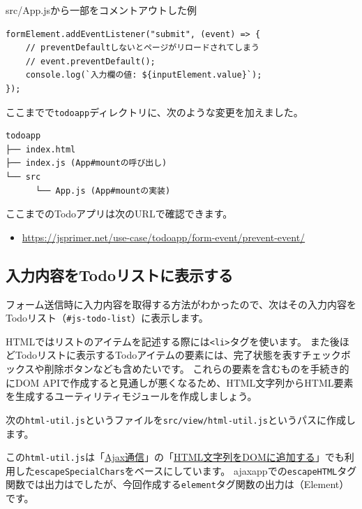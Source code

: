 \begin{listtitle}
src/App.jsから一部をコメントアウトした例
\end{listtitle}
\begin{lstlisting}
formElement.addEventListener("submit", (event) => {
    // preventDefaultしないとページがリロードされてしまう
    // event.preventDefault();
    console.log(`入力欄の値: ${inputElement.value}`);
});
\end{lstlisting}
\listend

ここまでで\texttt{todoapp}ディレクトリに、次のような変更を加えました。

\begin{lstlisting}
todoapp
├── index.html
├── index.js (App#mountの呼び出し)
└── src
      └── App.js (App#mountの実装)
\end{lstlisting}

ここまでのTodoアプリは次のURLで確認できます。

\begin{itemize}
\item
  \url{https://jsprimer.net/use-case/todoapp/form-event/prevent-event/}
\end{itemize}

\hypertarget{input-to-todolist}{%
\subsection{入力内容をTodoリストに表示する}\label{input-to-todolist}}

フォーム送信時に入力内容を取得する方法がわかったので、次はその入力内容をTodoリスト（\texttt{\#js-todo-list}）に表示します。

HTMLではリストのアイテムを記述する際には\texttt{<li>}タグを使います。
また後ほどTodoリストに表示するTodoアイテムの要素には、完了状態を表すチェックボックスや削除ボタンなども含めたいです。
これらの要素を含むものを手続き的にDOM
APIで作成すると見通しが悪くなるため、HTML文字列からHTML要素を生成するユーティリティモジュールを作成しましょう。

次の\texttt{html-util.js}というファイルを\texttt{src/view/html-util.js}というパスに作成します。

この\texttt{html-util.js}は「\hyperlink{usecase-ajax}{Ajax通信}」の「\hyperlink{html-to-dom}{HTML文字列をDOMに追加する}」でも利用した\texttt{escapeSpecialChars}をベースにしています。
ajaxappでの\texttt{escapeHTML}タグ関数では出力は\textbf{}でしたが、今回作成する\texttt{element}タグ関数の出力は\textbf{}（Element）です。

